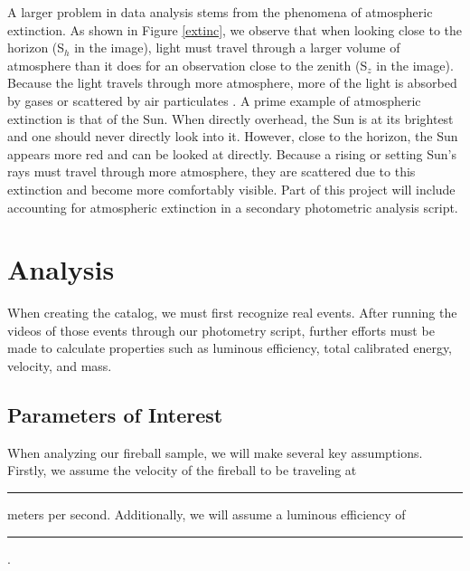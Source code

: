 A larger problem in data analysis stems from the phenomena of atmospheric extinction.
As shown in Figure \ref{extinc}, we observe that when looking close to the horizon (S$_h$ in the image), light must travel through a larger volume of atmosphere than it does for an observation close to the zenith (S$_z$ in the image).  
Because the light travels through more atmosphere, more of the light is absorbed by gases or scattered by air particulates \cite{noauthor_atmospheric_nodate}.
A prime example of atmospheric extinction is that of the Sun. 
When directly overhead, the Sun is at its brightest and one should never directly look into it.
However, close to the horizon, the Sun appears more red and can be looked at directly.
Because a rising or setting Sun's rays must travel through more atmosphere, they are scattered due to this extinction and become more comfortably visible.
Part of this project will include accounting for atmospheric extinction in a secondary photometric analysis script.

\section{Analysis}

When creating the catalog, we must first recognize real events. 
After running the videos of those events through our photometry script, further efforts must be made to calculate properties such as luminous efficiency, total calibrated energy, velocity, and mass.




\subsection{Parameters of Interest}

When analyzing our fireball sample, we will make several key assumptions.  
Firstly, we assume the velocity of the fireball to be traveling at \rule{1cm}{.1pt} meters per second.
Additionally, we will assume a luminous efficiency of \rule{1cm}{.1pt}.


